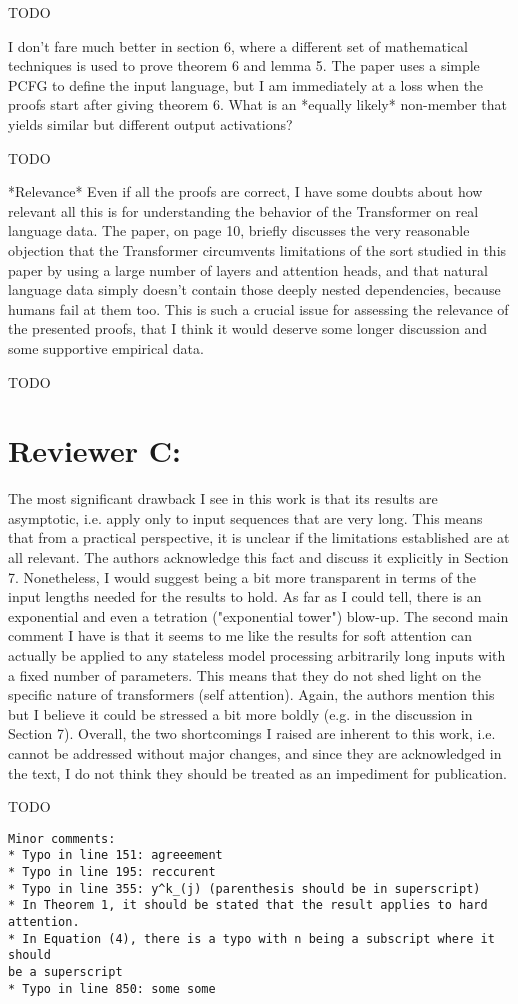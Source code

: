 \documentclass[11pt,a4paper]{article}
\newcounter{theorem}
\newcommand\response[1]{{\color{blue}#1}}
\begin{document}
\response{TODO}

I don’t fare much better in section 6, where a different set of
mathematical techniques is used to prove theorem 6 and lemma 5. The paper
uses a simple PCFG to define the input language, but I am immediately at a
loss when the proofs start after giving theorem 6. What is an *equally
likely* non-member that yields similar but different output activations?

\response{TODO}

*Relevance*
Even if all the proofs are correct, I have some doubts about how relevant
all this is for understanding the behavior of the Transformer on real
language data. The paper, on page 10, briefly discusses the very reasonable
objection that the Transformer circumvents limitations of the sort studied
in this paper by using a large number of layers and attention heads, and
that natural language data simply doesn’t contain those deeply nested
dependencies, because humans fail at them too. This is such a crucial issue
for assessing the relevance of the presented proofs, that I think it would
deserve some longer discussion and some supportive empirical data.

\response{TODO}


\section{Reviewer C:}

The most significant drawback I see in this work is that its results are
asymptotic, i.e. apply only to input sequences that are very long.  This
means that from a practical perspective, it is unclear if the limitations
established are at all relevant.  The authors acknowledge this fact and
discuss it explicitly in Section 7.  Nonetheless, I would suggest being a
bit more transparent in terms of the input lengths needed for the results to
hold.  As far as I could tell, there is an exponential and even a tetration
("exponential tower") blow-up.  The second main comment I have is that it
seems to me like the results for soft attention can actually be applied to
any stateless model processing arbitrarily long inputs with a fixed number
of parameters.  This means that they do not shed light on the specific
nature of transformers (self attention).  Again, the authors mention this
but I believe it could be stressed a bit more boldly (e.g. in the discussion
in Section 7).  Overall, the two shortcomings I raised are inherent to this
work, i.e. cannot be addressed without major changes, and since they are
acknowledged in the text, I do not think they should be treated as an
impediment for publication.

\response{TODO}

\begin{verbatim}
Minor comments:
* Typo in line 151: agreeement
* Typo in line 195: reccurent
* Typo in line 355: y^k_(j) (parenthesis should be in superscript)
* In Theorem 1, it should be stated that the result applies to hard
attention.
* In Equation (4), there is a typo with n being a subscript where it should
be a superscript
* Typo in line 850: some some
\end{verbatim}
\end{document}
